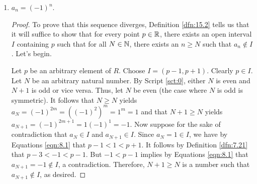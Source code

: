 \documentclass[../main.tex]{subfiles}
\begin{document}
\begin{exercise}
\begin{enumerate}[label={(\alph*)}]
\begin{proof}
            To prove that this sequence converges with limit $\lim_{n\to\infty}a_n=0$, Definitions \ref{dfn:15.5} and \ref{dfn:15.2} tell us that it will suffice to show that for every open interval $I$ containing 0, there exists $N\in\N$ such that if $n\geq N$, then $a_n\in I$. Let's begin.\par
            Let $I$ be an arbitrary interval containing 0. By Lemma \ref{lem:8.10}, there exists a region $(a,b)$ containing 0 such that $(a,b)\subset I$. By Corollary \ref{cly:6.12}, there exists a natural number $N$ such that $\frac{1}{b}<N$. Choose this $N$ to be our $N$. Now let $n$ be an arbitrary natural number such that $n\geq N$. It follows that $\frac{1}{b}<n$. Thus, since $0<b$ and $0<n$, we have by consecutive applications of Lemma \ref{lem:7.24} that $0<\frac{1}{n}<b$. Consequently, since we also know that $a<0$ and $a_n=\frac{1}{n}$, we have by transitivity and substitution that $a<a_n<b$. It follows by Equations \ref{eqn:8.1} that $a_n\in(a,b)$. Therefore, by Definition \ref{dfn:1.3}, $a_n\in I$, as desired.
        \end{proof}
        \item $a_n=(-1)^n$.
        \begin{proof}
            To prove that this sequence diverges, Definition \ref{dfn:15.2} tells us that it will suffice to show that for every point $p\in\mathbb{R}$, there exists an open interval $I$ containing $p$ such that for all $N\in\N$, there exists an $n\geq N$ such that $a_n\notin I$. Let's begin.\par
            Let $p$ be an arbitrary element of $R$. Choose $I=(p-1,p+1)$. Clearly $p\in I$. Let $N$ be an arbitrary natural number. By Script \ref{sct:0}, either $N$ is even and $N+1$ is odd or vice versa. Thus, let $N$ be even (the case where $N$ is odd is symmetric). It follows that $N\geq N$ yields $a_N=(-1)^{2m}=((-1)^2)^m=1^m=1$ and that $N+1\geq N$ yields $a_{N+1}=(-1)^{2m+1}=1(-1)^1=-1$. Now suppose for the sake of contradiction that $a_N\in I$ and $a_{N+1}\in I$. Since $a_N=1\in I$, we have by Equations \ref{eqn:8.1} that $p-1<1<p+1$. It follows by Definition \ref{dfn:7.21} that $p-3<-1<p-1$. But $-1<p-1$ implies by Equations \ref{eqn:8.1} that $a_{N+1}=-1\notin I$, a contradiction. Therefore, $N+1\geq N$ is a number such that $a_{N+1}\notin I$, as desired.
        \end{proof}
    \end{enumerate}
\end{exercise}
\end{document}
